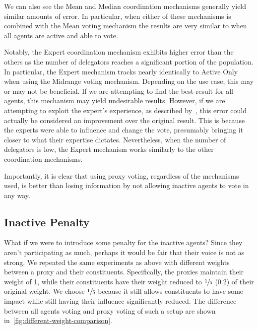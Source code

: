 We can also see the Mean and Median coordination mechanisms generally yield similar
amounts of error.
In particular, when either of these mechanisms is combined with the Mean voting
mechanism the results are very similar to when all agents are active and able to vote.

Notably, the Expert coordination mechanism exhibits higher error than the others as the number
of delegators reaches a significant portion of the population.
In particular, the Expert mechanism tracks nearly identically to Active Only when
using the Midrange voting mechanism.
Depending on the use case, this may or may not be beneficial.
If we are attempting to find the best result for all agents, this mechanism may yield
undesirable results.
However, if we are attempting to exploit the expert's experience, as described
by~\cite{Miller1969}, this error could actually be considered an improvement over
the original result.
This is because the experts were able to influence and change the vote, presumably
bringing it closer to what their expertise dictates.
Nevertheless, when the number of delegators is low, the Expert mechanism works
similarly to the other coordination mechanisms.

Importantly, it is clear that using proxy voting, regardless of the mechanisms used,
is better than losing information by not allowing inactive agents to vote in any way.

\subsection{Inactive Penalty}\label{subsec:inactive-penalty}
What if we were to introduce some penalty for the inactive agents?
Since they aren't participating as much, perhaps it would be fair that their voice is
not as strong.
We repeated the same experiments as above with different weights between a proxy and
their constituents.
Specifically, the proxies maintain their weight of 1, while their constituents have
their weight reduced to $\sfrac{1}{5}$ (0.2) of their original weight.
We choose $\sfrac{1}{5}$ because it still allows constituents to have some impact
while still having their influence significantly reduced.
The difference between all agents voting and proxy voting of such a setup are
shown in~\autoref{fig:different-weight-comparison}.

